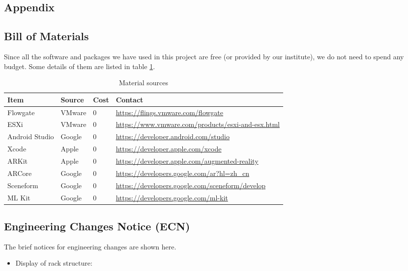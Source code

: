 \documentclass[11pt,a4paper]{article}
\begin{document}
\begin{onehalfspace}
\newpage
\section{Appendix}
\subsection{Bill of Materials}
Since all the software and packages we have used in this project are free (or provided by our institute), we do not need to spend any budget. Some details of them are listed in table \ref{bill_tbl}.

\begin{table}[htbp]
  \centering
  \caption{Material sources}
    \begin{tabular}{|l|l|l|l|}
    \hline
    Item  & Source & Cost  & Contact \\
    \hline
    Flowgate & VMware & 0 & \url{https://flings.vmware.com/flowgate} \\
    \hline
    ESXi  & VMware & 0 & \url{https://www.vmware.com/products/esxi-and-esx.html} \\
    \hline
    Android Studio & Google & 0 & \url{https://developer.android.com/studio} \\
    \hline
    Xcode & Apple & 0 & \url{https://developer.apple.com/xcode} \\
    \hline
    ARKit & Apple & 0 & \url{https://developer.apple.com/augmented-reality} \\
    \hline
    ARCore & Google & 0 & \url{https://developers.google.com/ar?hl=zh_cn} \\
    \hline
    Sceneform & Google & 0 & \url{https://developers.google.com/sceneform/develop} \bigstrut\\
    \hline
    ML Kit & Google & 0 & \url{https://developers.google.com/ml-kit} \\
    \hline
    \end{tabular}%
  \label{bill_tbl}%
\end{table}%



\subsection{Engineering Changes Notice (ECN) \label{brief_ECN}} 

The brief notices for engineering changes are shown here.
\begin{itemize}
    \item[1.] Display of rack structure:
    

\end{itemize}
\end{onehalfspace}
\end{document}
